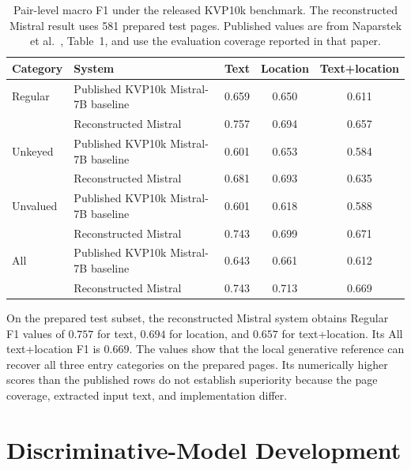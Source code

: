 \begin{table}[ht]
  \centering
  \caption{Pair-level macro F1 under the released KVP10k benchmark. The
  reconstructed Mistral result uses 581 prepared test pages. Published values
  are from Naparstek et al.~\cite{kvp10k}, Table~1, and use the evaluation
  coverage reported in that paper.}
  \label{tab:exp1-overall}
  \begin{tabular}{@{}llccc@{}}
    \toprule
    \textbf{Category} & \textbf{System} & \textbf{Text} & \textbf{Location} & \textbf{Text+location} \\
    \midrule
    Regular  & Published KVP10k Mistral-7B baseline & 0.659 & 0.650 & 0.611 \\
             & Reconstructed Mistral   & 0.757 & 0.694 & 0.657 \\
    \midrule
    Unkeyed  & Published KVP10k Mistral-7B baseline & 0.601 & 0.653 & 0.584 \\
             & Reconstructed Mistral   & 0.681 & 0.693 & 0.635 \\
    \midrule
    Unvalued & Published KVP10k Mistral-7B baseline & 0.601 & 0.618 & 0.588 \\
             & Reconstructed Mistral   & 0.743 & 0.699 & 0.671 \\
    \midrule
    All      & Published KVP10k Mistral-7B baseline & 0.643 & 0.661 & 0.612 \\
             & Reconstructed Mistral   & 0.743 & 0.713 & 0.669 \\
    \bottomrule
  \end{tabular}
\end{table}

On the prepared test subset, the reconstructed Mistral system obtains Regular
F1 values of $0.757$ for text, $0.694$ for location, and $0.657$ for
text+location. Its All text+location F1 is $0.669$. The values show that the
local generative reference can recover all three entry categories on the
prepared pages. Its numerically higher scores than the published rows do not
establish superiority because the page coverage, extracted input text, and
implementation differ.

\section{Discriminative-Model Development}
\label{sec:exp2}

